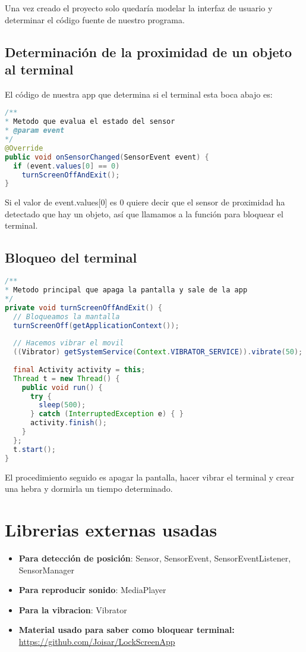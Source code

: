 Una vez creado el proyecto solo quedaría modelar la interfaz de usuario y determinar el código fuente de nuestro programa.

\subsection{Determinación de la proximidad de un objeto al terminal}
El código de nuestra app que determina si el terminal esta boca abajo es:

\begin{lstlisting}[language=Java]
/**
* Metodo que evalua el estado del sensor
* @param event
*/
@Override
public void onSensorChanged(SensorEvent event) {
  if (event.values[0] == 0)
    turnScreenOffAndExit();
}
\end{lstlisting}

Si el valor de event.values[0] es 0 quiere decir que el sensor de proximidad ha detectado que hay un objeto, así que llamamos a la función para bloquear el terminal.

\subsection{Bloqueo del terminal}

\begin{lstlisting}[language=Java]
/**
* Metodo principal que apaga la pantalla y sale de la app
*/
private void turnScreenOffAndExit() {
  // Bloqueamos la mantalla
  turnScreenOff(getApplicationContext());
	
  // Hacemos vibrar el movil
  ((Vibrator) getSystemService(Context.VIBRATOR_SERVICE)).vibrate(50);
	
  final Activity activity = this;
  Thread t = new Thread() {
    public void run() {
      try {
        sleep(500);
      } catch (InterruptedException e) { }
      activity.finish();
    }
  };
  t.start();
}
\end{lstlisting}

El procedimiento seguido es apagar la pantalla, hacer vibrar el terminal y crear una hebra y dormirla un tiempo determinado.

\section{Librerias externas usadas}
\begin{itemize}
	\item \textbf{Para detección de posición}: Sensor, SensorEvent, SensorEventListener, SensorManager
	\item \textbf{Para reproducir sonido}: MediaPlayer
	\item \textbf{Para la vibracion}: Vibrator
	\item \textbf{Material usado para saber como bloquear terminal:} \url{https://github.com/Joisar/LockScreenApp}
		
\end{itemize}

